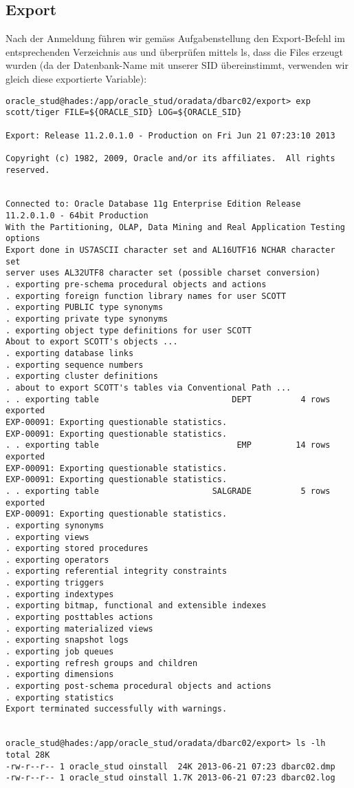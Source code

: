 \documentclass[11pt,a4paper,parskip=half]{scrartcl}
\begin{document}
\subsection{Export}
Nach der Anmeldung führen wir gemäss Aufgabenstellung den Export-Befehl im entsprechenden Verzeichnis aus und überprüfen mittels ls, dass die Files erzeugt wurden (da der Datenbank-Name mit unserer SID übereinstimmt, verwenden wir gleich diese exportierte Variable):
\begin{lstlisting}
oracle_stud@hades:/app/oracle_stud/oradata/dbarc02/export> exp scott/tiger FILE=${ORACLE_SID} LOG=${ORACLE_SID}

Export: Release 11.2.0.1.0 - Production on Fri Jun 21 07:23:10 2013

Copyright (c) 1982, 2009, Oracle and/or its affiliates.  All rights reserved.


Connected to: Oracle Database 11g Enterprise Edition Release 11.2.0.1.0 - 64bit Production
With the Partitioning, OLAP, Data Mining and Real Application Testing options
Export done in US7ASCII character set and AL16UTF16 NCHAR character set
server uses AL32UTF8 character set (possible charset conversion)
. exporting pre-schema procedural objects and actions
. exporting foreign function library names for user SCOTT 
. exporting PUBLIC type synonyms
. exporting private type synonyms
. exporting object type definitions for user SCOTT 
About to export SCOTT's objects ...
. exporting database links
. exporting sequence numbers
. exporting cluster definitions
. about to export SCOTT's tables via Conventional Path ...
. . exporting table                           DEPT          4 rows exported
EXP-00091: Exporting questionable statistics.
EXP-00091: Exporting questionable statistics.
. . exporting table                            EMP         14 rows exported
EXP-00091: Exporting questionable statistics.
EXP-00091: Exporting questionable statistics.
. . exporting table                       SALGRADE          5 rows exported
EXP-00091: Exporting questionable statistics.
. exporting synonyms
. exporting views
. exporting stored procedures
. exporting operators
. exporting referential integrity constraints
. exporting triggers
. exporting indextypes
. exporting bitmap, functional and extensible indexes
. exporting posttables actions
. exporting materialized views
. exporting snapshot logs
. exporting job queues
. exporting refresh groups and children
. exporting dimensions
. exporting post-schema procedural objects and actions
. exporting statistics
Export terminated successfully with warnings.


oracle_stud@hades:/app/oracle_stud/oradata/dbarc02/export> ls -lh
total 28K
-rw-r--r-- 1 oracle_stud oinstall  24K 2013-06-21 07:23 dbarc02.dmp
-rw-r--r-- 1 oracle_stud oinstall 1.7K 2013-06-21 07:23 dbarc02.log
\end{lstlisting}
\end{document}
